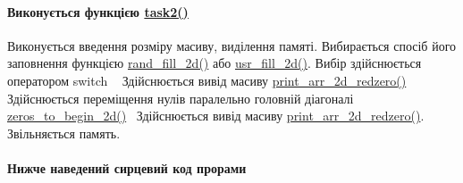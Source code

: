 \paragraph*{Виконується функцією \hyperlink{main_8c_afb35a54f26606b4808ac0a8d9ad55433}{task2()}}

Виконується введення розміру масиву, виділення пам\textquotesingle{}яті. Вибирається спосіб його заповнення функцією \hyperlink{main_8c_a3dd7ddf4e8efd6ad27441f244b6ac232}{rand\+\_\+fill\+\_\+2d()} або \hyperlink{main_8c_abfbfcf6cfc51d4db85271a06ec30e7d3}{usr\+\_\+fill\+\_\+2d()}. Вибір здійснюється оператором {\ttfamily switch} ~\newline
 Здійснюється вивід масиву \hyperlink{main_8c_a48d1fca4591b9e83a3cbc3bce60598ee}{print\+\_\+arr\+\_\+2d\+\_\+redzero()}~\newline
Здійснюється переміщення нулів паралельно головній діагоналі \hyperlink{main_8c_ad9267778aed4908cc85b34675cb83a50}{zeros\+\_\+to\+\_\+begin\+\_\+2d()}~\newline
Здійснюється вивід масиву \hyperlink{main_8c_a48d1fca4591b9e83a3cbc3bce60598ee}{print\+\_\+arr\+\_\+2d\+\_\+redzero()}. Звільняється пам\textquotesingle{}ять. \paragraph*{Нижче наведений сирцевий код прорами}



